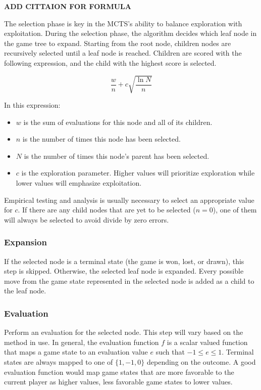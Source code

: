 \documentclass[10pt]{article}
\begin{document}
\textbf{ADD CITTAION FOR FORMULA}

The selection phase is key in the MCTS's ability to balance exploration with exploitation. During the selection phase, the algorithm decides which leaf node in the game tree to expand. Starting from the root node, children nodes are recursively selected until a leaf node is reached. Children are scored with the following expression, and the child with the highest score is selected.

\begin{equation}
    \frac{w}{n} + c \sqrt{ \frac{\ln N}{n} }
\end{equation}

In this expression:

\begin{itemize}
    \item $w$ is the sum of evaluations for this node and all of its children.
    \item $n$ is the number of times this node has been selected.
    \item $N$ is the number of times this node's parent has been selected. 
    \item $c$ is the exploration parameter. Higher values will prioritize exploration while lower values will emphasize exploitation.
\end{itemize}

Empirical testing and analysis is usually necessary to select an appropriate value for $c$. If there are any child nodes that are yet to be selected ($n = 0$), one of them will always be selected to avoid divide by zero errors.

\subsubsection{Expansion}

If the selected node is a terminal state (the game is won, lost, or drawn), this step is skipped. Otherwise, the selected leaf node is expanded. Every possible move from the game state represented in the selected node is added as a child to the leaf node.

\subsubsection{Evaluation}

Perform an evaluation for the selected node. This step will vary based on the method in use. In general, the evaluation function $f$ is a scalar valued function that maps a game state to an evaluation value $e$ such that $-1 \leq e \leq 1$. Terminal states are always mapped to one of $\{1, -1, 0\}$ depending on the outcome. A good evaluation function would map game states that are more favorable to the current player as higher values, less favorable game states to lower values. 
\end{document}
